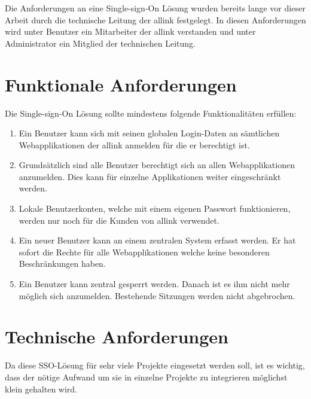 Die Anforderungen an eine Single-sign-On Lösung wurden bereits lange vor dieser Arbeit durch die technische Leitung der allink festgelegt. In diesen Anforderungen wird unter Benutzer ein Mitarbeiter der allink verstanden und unter Administrator ein Mitglied der technischen Leitung.

\section{Funktionale Anforderungen}
\label{sec:funktionale_anforderungen}
Die Single-sign-On Lösung sollte mindestens folgende Funktionalitäten erfüllen:
\begin{enumerate}
  \item Ein Benutzer kann sich mit seinen globalen Login-Daten an sämtlichen Webapplikationen der allink anmelden für die er berechtigt ist.
  \item Grundsätzlich sind alle Benutzer berechtigt sich an allen Webapplikationen anzumelden. Dies kann für einzelne Applikationen weiter eingeschränkt werden.
  \item Lokale Benutzerkonten, welche mit einem eigenen Passwort funktionieren, werden nur noch für die Kunden von allink verwendet.
  \item Ein neuer Benutzer kann an einem zentralen System erfasst werden. Er hat sofort die Rechte für alle Webapplikationen welche keine besonderen Beschränkungen haben.
  \item Ein Benutzer kann zentral gesperrt werden. Danach ist es ihm nicht mehr möglich sich anzumelden. Bestehende Sitzungen werden nicht abgebrochen.
\end{enumerate}

\section{Technische Anforderungen}
\label{sec:technische_anforderungen}
Da diese SSO-Lösung für sehr viele Projekte eingesetzt werden soll, ist es wichtig, dass der nötige Aufwand um sie in einzelne Projekte zu integrieren möglichst klein gehalten wird.